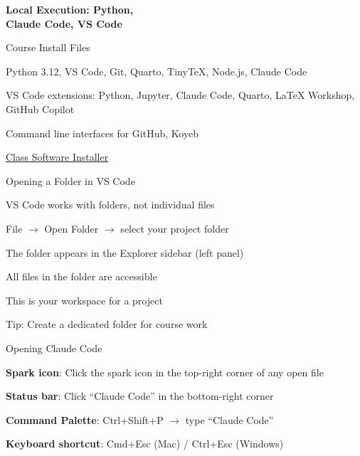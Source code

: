 \documentclass[aspectratio=169]{beamer}
\begin{document}
\begin{frame}[plain]
\vfill
\begin{center}
{\fontsize{26}{30}\selectfont\bfseries\color{titlegray} Local Execution: Python,\\ Claude Code, VS Code}
\end{center}
\vfill
\end{frame}
\begin{frame}{Course Install Files}
\begin{baritemize}
  \item Python 3.12, VS Code, Git, Quarto, TinyTeX, Node.js, Claude Code
  \item VS Code extensions: Python, Jupyter, Claude Code, Quarto, LaTeX Workshop, GitHub Copilot
 \item Command line interfaces for GitHub, Koyeb
\end{baritemize}
\vspace{0.3cm}
\begin{shadedbox}
\centering\href{https://kerryback.com/mgmt675/software.html}{Class Software Installer}
\end{shadedbox}
\end{frame}

\begin{frame}{Opening a Folder in VS Code}
\begin{baritemize}
  \item VS Code works with \alert{folders}, not individual files
  \item File $\rightarrow$ Open Folder $\rightarrow$ select your project folder
  \item The folder appears in the Explorer sidebar (left panel)
  \item All files in the folder are accessible
  \item This is your workspace for a project
\end{baritemize}
\vspace{0.3cm}
\begin{shadedbox}
\centering Tip: Create a dedicated folder for course work
\end{shadedbox}
\end{frame}

\begin{frame}{Opening Claude Code}
\begin{baritemize}
  \item \textbf{Spark icon}: Click the spark icon in the top-right corner of any open file
  \item \textbf{Status bar}: Click ``Claude Code'' in the bottom-right corner
  \item \textbf{Command Palette}: Ctrl+Shift+P $\rightarrow$ type ``Claude Code''
  \item \textbf{Keyboard shortcut}: Cmd+Esc (Mac) / Ctrl+Esc (Windows)
\end{baritemize}
\end{frame}
\end{document}

